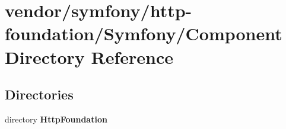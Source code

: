 \section{vendor/symfony/http-\/foundation/\+Symfony/\+Component Directory Reference}
\label{dir_7b82546a6d14c7949dfd183d4b077f6a}
\subsection*{Directories}
\begin{DoxyCompactItemize}
\item 
directory {\bf Http\+Foundation}
\end{DoxyCompactItemize}
